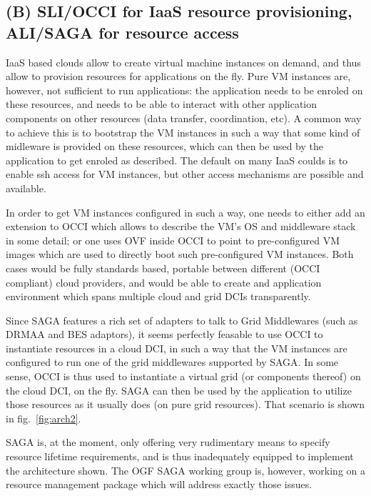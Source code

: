 \documentclass[10pt,conference,final,letterpaper,twoside,twocolumn,]{IEEEtran}
\begin{document}

\subsection{(B) SLI/OCCI for IaaS resource provisioning, ALI/SAGA for resource access}

IaaS based clouds allow to create virtual machine instances on demand,
and thus allow to provision resources for applications on the fly.
Pure VM instances are, however, not sufficient to run applications:
the application needs to be enroled on these resources, and needs to
be able to interact with other application components on other
resources (data transfer, coordination, etc).  A common way to achieve
this is to bootstrap the VM instances in such a way that some kind of
midleware is provided on these resources, which can then be used by
the application to get enroled as described.  The default on many IaaS
coulds is to enable ssh access for VM instances, but other access
mechanisms are possible and available.

In order to get VM instances configured in such a way, one needs to
either add an extension to OCCI which allows to describe the VM's OS
and middleware stack in some detail; or one uses OVF inside OCCI to
point to pre-configured VM images which are used to directly boot such
pre-configured VM instances.  Both cases would be fully standards
based, portable between different (OCCI compliant) cloud providers,
and would be able to create and application environment which spans
multiple cloud and grid DCIs transparently.

Since SAGA features a rich set of adapters to talk to Grid Middlewares
(such as DRMAA and BES adaptors), it seems perfectly feasable to use
OCCI to instantiate resources in a cloud DCI, in such a way that the
VM instances are configured to run one of the grid middlewares
supported by SAGA.  In some sense, OCCI is thus used to instantiate a
virtual grid (or components thereof) on the cloud DCI, on the fly.
SAGA can then be used by the application to utilize those resources as
it usually does (on pure grid resources).  That scenario is shown in
fig.~\ref{fig:arch2}.

SAGA is, at the moment, only offering very rudimentary means to
specify resource lifetime requirements, and is thus inadequately
equipped to implement the architecture shown.  The OGF SAGA working
group is, however, working on a resource management package which will
address exactly those issues.
\end{document}
